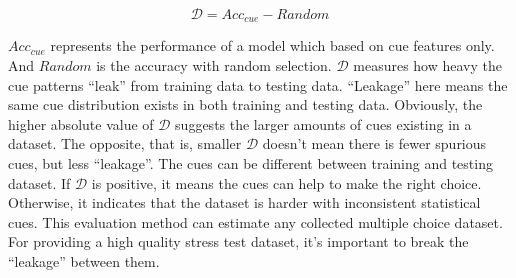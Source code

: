 \begin{equation}
    \mathcal{D} = {Acc}_{cue}  -
    {Random}
\end{equation}

${Acc}_{cue} $ represents the performance of a model which based on cue features only. 
And ${Random}$ is the accuracy with random selection. 
$\mathcal{D}$ measures how heavy the cue patterns ``leak'' from training 
data to testing  data. ``Leakage'' here means the same cue distribution exists in both training 
and testing data. 
Obviously, the higher absolute value of $\mathcal{D}$ suggests 
the larger amounts of cues existing in a dataset. The opposite, that is, smaller $\mathcal{D}$
doesn't mean there is fewer spurious cues, but less ``leakage''. 
The cues can be different between training and testing dataset.
If $\mathcal{D}$ is positive, it means the 
cues can help to make the right choice. Otherwise, it indicates that the dataset is harder with
inconsistent statistical cues.  This evaluation method 
can estimate any collected multiple choice dataset. 
For providing  a high quality stress test dataset, 
it's important to break the ``leakage'' 
between them.



